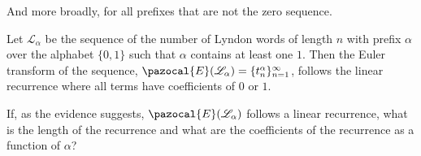 And more broadly, for all prefixes that are not the zero sequence.
\begin{conjecture}
  Let $\mathcal{L}_\alpha$ be the sequence of the
  number of Lyndon words of length $n$ with prefix $\alpha$ over the alphabet
  $\{0,1\}$ such that $\alpha$ contains at least one $1$.
  Then the Euler transform of the sequence,
  $\pazocal{E}(\mathcal{L_\alpha}) = \{t_{n}^\alpha\}_{n=1}^\infty$,
  follows the linear recurrence where all terms have coefficients of $0$ or $1$.
\end{conjecture}

\begin{openquestion}
  If, as the evidence suggests, $\pazocal{E}(\mathcal{L_\alpha})$ follows a
  linear recurrence,
  what is the length of the recurrence and
  what are the coefficients of the recurrence
  as a function of $\alpha$?
\end{openquestion}





